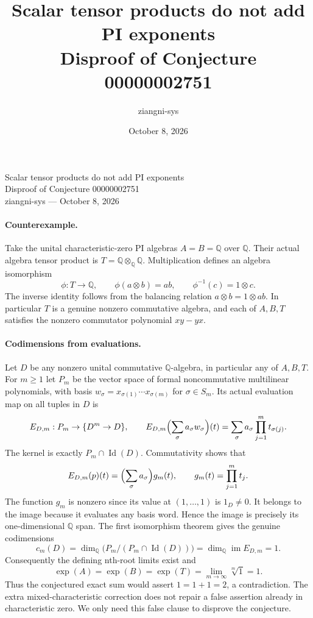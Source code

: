 \documentclass[11pt]{article}
\title{Scalar tensor products do not add PI exponents\\Disproof of Conjecture 00000002751}
\author{ziangni-sys}
\date{October 8, 2026}
\begin{document}
\begin{center}
{\Large Scalar tensor products do not add PI exponents}\\[4pt]
Disproof of Conjecture 00000002751\\[4pt]
ziangni-sys --- October 8, 2026
\end{center}
\paragraph{Counterexample.}
Take the unital characteristic-zero PI algebras $A=B=\mathbb Q$ over
$\mathbb Q$. Their actual algebra tensor product is
$T=\mathbb Q\otimes_{\mathbb Q}\mathbb Q$. Multiplication defines an
algebra isomorphism
\[
 \phi:T\longrightarrow\mathbb Q,\qquad \phi(a\otimes b)=ab,
 \qquad \phi^{-1}(c)=1\otimes c.
\]
The inverse identity follows from the balancing relation
$a\otimes b=1\otimes ab$. In particular $T$ is a genuine nonzero
commutative algebra, and each of $A,B,T$ satisfies the nonzero
commutator polynomial $xy-yx$.

\paragraph{Codimensions from evaluations.}
Let $D$ be any nonzero unital commutative $\mathbb Q$-algebra, in
particular any of $A,B,T$. For $m\geq1$ let $P_m$ be the vector space
of formal noncommutative multilinear polynomials, with basis
$w_\sigma=x_{\sigma(1)}\cdots x_{\sigma(m)}$ for $\sigma\in S_m$.
Its actual evaluation map on all tuples in $D$ is
\[
 E_{D,m}:P_m\to\{D^m\to D\},\qquad
 E_{D,m}\Bigl(\sum_\sigma a_\sigma w_\sigma\Bigr)(t)
 =\sum_\sigma a_\sigma\prod_{j=1}^m t_{\sigma(j)}.
\]
The kernel is exactly $P_m\cap\operatorname{Id}(D)$. Commutativity
shows that
\[
 E_{D,m}(p)(t)=\Bigl(\sum_\sigma a_\sigma\Bigr)g_m(t),
 \qquad g_m(t)=\prod_{j=1}^m t_j.
\]
The function $g_m$ is nonzero since its value at $(1,\ldots,1)$ is
$1_D\ne0$. It belongs to the image because it evaluates any basis
word. Hence the image is precisely its one-dimensional $\mathbb Q$
span. The first isomorphism theorem gives the genuine codimensions
\[
 c_m(D)=\dim_{\mathbb Q}\bigl(P_m/(P_m\cap\operatorname{Id}(D))\bigr)
       =\dim_{\mathbb Q}\operatorname{im}E_{D,m}=1.
\]
Consequently the defining nth-root limits exist and
\[
 \operatorname{exp}(A)=\operatorname{exp}(B)=\operatorname{exp}(T)
 =\lim_{m\to\infty}\sqrt[m]{1}=1.
\]
Thus the conjectured exact sum would assert $1=1+1=2$, a
contradiction. The extra mixed-characteristic correction does not
repair a false assertion already in characteristic zero. We only
need this false clause to disprove the conjecture.
\end{document}
